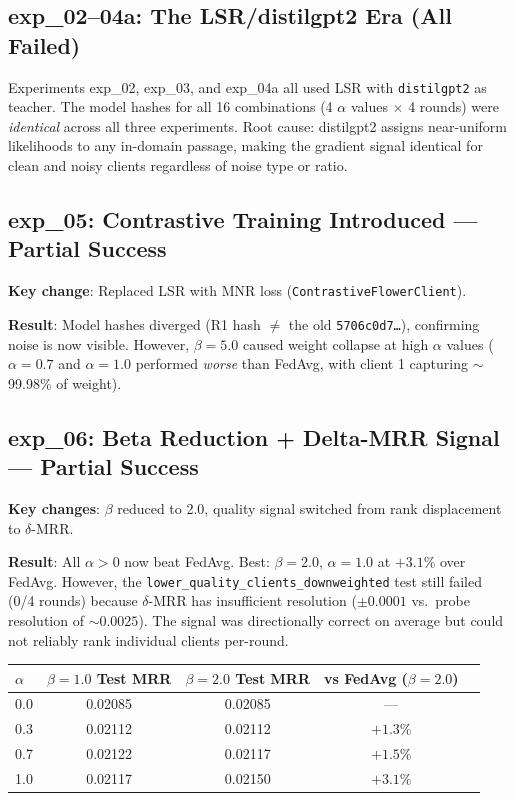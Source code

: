 \documentclass[12pt,a4paper]{article}
\begin{document}
\subsection{exp\_02--04a: The LSR/distilgpt2 Era (All Failed)}

Experiments exp\_02, exp\_03, and exp\_04a all used LSR with \texttt{distilgpt2} as teacher. The model hashes for all 16 combinations (4 $\alpha$ values $\times$ 4 rounds) were \textit{identical} across all three experiments. Root cause: distilgpt2 assigns near-uniform likelihoods to any in-domain passage, making the gradient signal identical for clean and noisy clients regardless of noise type or ratio.

\subsection{exp\_05: Contrastive Training Introduced --- Partial Success}

\textbf{Key change}: Replaced LSR with MNR loss (\texttt{ContrastiveFlowerClient}).

\textbf{Result}: Model hashes diverged (R1 hash $\neq$ the old \texttt{5706c0d7\ldots}), confirming noise is now visible. However, $\beta=5.0$ caused weight collapse at high $\alpha$ values ($\alpha=0.7$ and $\alpha=1.0$ performed \textit{worse} than FedAvg, with client 1 capturing $\sim$99.98\% of weight).

\subsection{exp\_06: Beta Reduction + Delta-MRR Signal --- Partial Success}

\textbf{Key changes}: $\beta$ reduced to 2.0, quality signal switched from rank displacement to $\delta$-MRR.

\textbf{Result}: All $\alpha > 0$ now beat FedAvg. Best: $\beta=2.0$, $\alpha=1.0$ at $+3.1\%$ over FedAvg. However, the \texttt{lower\_quality\_clients\_downweighted} test still failed (0/4 rounds) because $\delta$-MRR has insufficient resolution ($\pm 0.0001$ vs.\ probe resolution of $\sim 0.0025$). The signal was directionally correct on average but could not reliably rank individual clients per-round.

\begin{center}
\renewcommand{\arraystretch}{1.3}
\begin{tabular}{lcccc}
\toprule
\textbf{$\alpha$} & \textbf{$\beta=1.0$ Test MRR} & \textbf{$\beta=2.0$ Test MRR} & \textbf{vs FedAvg ($\beta=2.0$)} \\
\midrule
0.0 & 0.02085 & 0.02085 & --- \\
0.3 & 0.02112 & 0.02112 & $+1.3\%$ \\
0.7 & 0.02122 & 0.02117 & $+1.5\%$ \\
1.0 & 0.02117 & 0.02150 & $+3.1\%$ \\
\bottomrule
\end{tabular}
\end{center}
\end{document}
